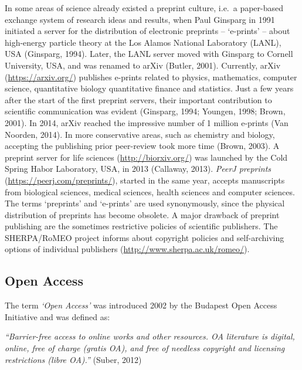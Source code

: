\documentclass[10pt,fleqn]{wlpeerj}
\begin{document}
In
some
areas
of
science
already
existed
a
preprint
culture,
i.e.~a
paper-based
exchange
system
of
research
ideas
and
results,
when
Paul
Ginsparg
in
1991
initiated
a
server
for
the
distribution
of
electronic
preprints
--
`e-prints'
--
about
high-energy
particle
theory
at
the
Los
Alamos
National
Laboratory
(LANL),
USA
(Ginsparg,
1994).
Later,
the
LANL
server
moved
with
Ginsparg
to
Cornell
University,
USA,
and
was
renamed
to
arXiv
(Butler,
2001).
Currently,
arXiv
(\url{https://arxiv.org/})
publishes
e-prints
related
to
physics,
mathematics,
computer
science,
quantitative
biology
quantitative
finance
and
statistics.
Just
a few
years
after
the
start
of
the
first
preprint
servers,
their
important
contribution
to
scientific
communication
was
evident
(Ginsparg,
1994;
Youngen,
1998;
Brown,
2001).
In
2014,
arXiv
reached
the
impressive
number
of 1
million
e-prints
(Van
Noorden,
2014).
In
more
conservative
areas,
such
as
chemistry
and
biology,
accepting
the
publishing
prior
peer-review
took
more
time
(Brown,
2003).
A
preprint
server
for
life
sciences
(\url{http://biorxiv.org/})
was
launched
by
the
Cold
Spring
Habor
Laboratory,
USA,
in
2013
(Callaway,
2013).
\emph{PeerJ
preprints}
(\url{https://peerj.com/preprints/}),
started
in
the
same
year,
accepts
manuscripts
from
biological
sciences,
medical
sciences,
health
sciences
and
computer
sciences.
The
terms
`preprints'
and
`e-prints'
are
used
synonymously,
since
the
physical
distribution
of
preprints
has
become
obsolete.
A
major
drawback
of
preprint
publishing
are
the
sometimes
restrictive
policies
of
scientific
publishers.
The
SHERPA/RoMEO
project
informs
about
copyright
policies
and
self-archiving
options
of
individual
publishers
(\url{http://www.sherpa.ac.uk/romeo/}).

\subsection{Open
Access}\label{open-access}

The
term
\emph{`Open
Access'}
was
introduced
2002
by
the
Budapest
Open
Access
Initiative
and
was
defined
as:

\emph{``Barrier-free
access
to
online
works
and
other
resources.
OA
literature
is
digital,
online,
free
of
charge
(gratis
OA),
and
free
of
needless
copyright
and
licensing
restrictions
(libre
OA).''}
(Suber,
2012)
\end{document}

